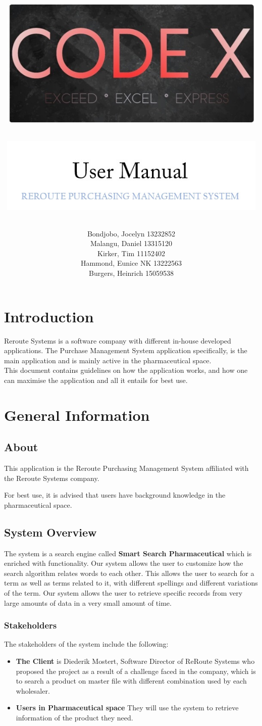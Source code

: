 \documentclass[a4paper,10pt]{article}
\title{\includegraphics[width=13cm]{CodeXBanner2rounded.jpg} \\
       \vspace{0.2cm}
       \begin{large}
       \includegraphics[width=13cm]{UserManual.jpg} \\
       \end{large}
       }
\date{}
\author{	Bondjobo, Jocelyn 		13232852 		\\
		Malangu, Daniel		13315120		\\
		Kirker, Tim			11152402		\\
		Hammond, Eunice	NK	13222563		\\
		Burgers, Heinrich		15059538		\\
}
\begin{document}
\maketitle
\thispagestyle{empty}
\clearpage

\newpage
{}
\thispagestyle{empty}
\tableofcontents
\clearpage

\newpage
{}


\section{Introduction}
Reroute Systems is a software company with different in-house developed applications. The Purchase Management System 
application specifically, is the main application and is mainly active in the pharmaceutical space.\\
This document contains guidelines on how the application works, and how one can maximise the application and all it entails for best use.\\

\section{General Information}
\subsection{About}
This application is the Reroute Purchasing Management System affiliated with the Reroute Systems company.\

For best use, it is advised that users have background knowledge in the pharmaceutical space.\\

\subsection{System Overview}
The system is a search engine called \textbf{Smart Search Pharmaceutical} which is enriched with functionality. Our system allows the user to customize how the search algorithm relates words to each other. This allows the user to search for a term as well as terms related to it, with different spellings and different variations of the term. Our system allows the user to retrieve specific records from very large amounts of data in a very small amount of time. 

	\subsubsection{Stakeholders}
	The stakeholders of the system include the following:
	\begin{itemize}
	\item \textbf{The Client} is Diederik Mostert, Software Director of ReRoute Systems who proposed the project as a result of a challenge faced in the company, which is to search a product on master file with different combination used by each wholesaler.
	\item \textbf{Users in Pharmaceutical space} They will use the system to retrieve information of the product they need.
	\end{itemize}
\end{document}
